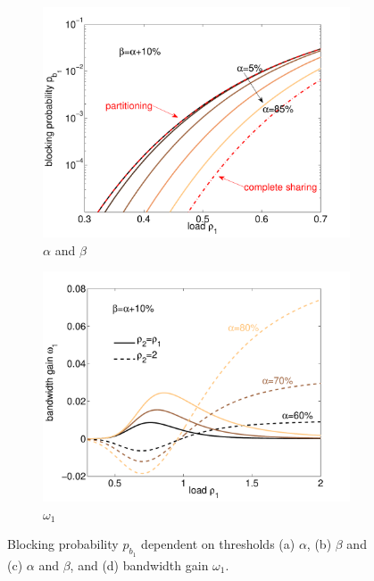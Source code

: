 \begin{figure}[tb]
\begin{subfigure}{.49\textwidth}
 \includegraphics[width=\linewidth]{aggregation/performance_model/figures/m2_n20_alphaplus2_equal}
 \caption{$\alpha$ and $\beta$}
 \label{fig:m2_n20_alphaplus2_equal}
\end{subfigure}
\begin{subfigure}{.49\textwidth}
 \centering
 \includegraphics[width=\linewidth]{aggregation/performance_model/figures/bwgain_rhocomp}
 \caption{$\omega_1$}
 \label{fig:bwgain_rhocomp}
\end{subfigure}
\caption{Blocking probability $p_{b_1}$ dependent on thresholds (a) $\alpha$, (b) $\beta$ and (c) $\alpha$ and $\beta$, and (d) bandwidth gain $\omega_1$.}
\label{fig:m2_n20}
\end{figure}

